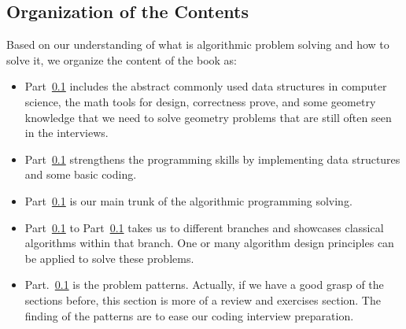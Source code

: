 \documentclass[../main.tex]{subfiles}
\begin{document}
\subsection{Organization of the Contents}
Based on our understanding of what is algorithmic problem solving and how to solve it, we organize the content of the book as:
\begin{itemize}
    \item Part~\ref{} includes the abstract commonly used data structures in computer science, the math tools for design, correctness prove, and some geometry knowledge that we need to solve geometry problems that are still often seen in the interviews.
    \item Part~\ref{}  strengthens the programming skills by implementing data structures and some basic coding.
    \item Part~\ref{} is our main trunk of the algorithmic programming solving.
    \item Part~\ref{} to Part~\ref{} takes us to different branches and showcases classical algorithms within that branch. One or many algorithm design principles can be applied to solve these problems. 
    \item Part.~\ref{} is the problem patterns. Actually, if we have a good grasp of the sections before, this section is more of a review and exercises section. The finding of the patterns are to ease our coding interview preparation. 
\end{itemize}

    

\end{document}
